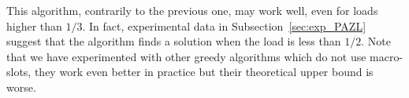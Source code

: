 \documentclass[10pt, conference, letterpaper]{IEEEtran}
\begin{document}
% 
% 
% 
	
This algorithm, contrarily to the previous one, may work well, even for loads higher than $1/3$.
In fact, experimental data in Subsection~\ref{sec:exp_PAZL} suggest that the algorithm finds a solution when the load is less than $1/2$. Note that we have experimented with other greedy algorithms which do not use macro-slots, they work even better in practice but their theoretical upper bound is worse.
\end{document}
